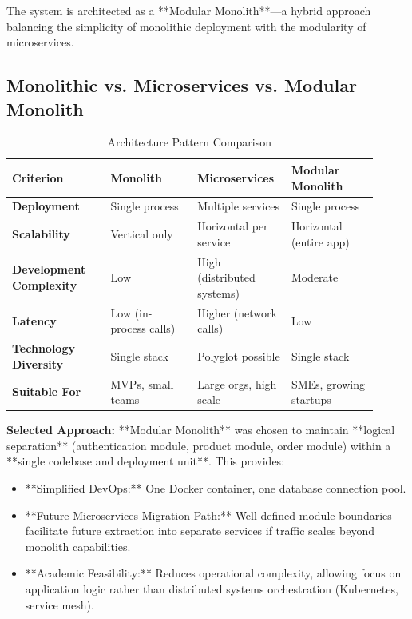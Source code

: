 The system is architected as a **Modular Monolith**—a hybrid approach balancing the simplicity of monolithic deployment with the modularity of microservices.

\subsection{Monolithic vs. Microservices vs. Modular Monolith}

\begin{table}[H]
\centering
\caption{Architecture Pattern Comparison}
\label{tab:architecture_patterns}
\begin{tabular}{@{}p{0.25\linewidth}p{0.22\linewidth}p{0.22\linewidth}p{0.22\linewidth}@{}}
\toprule
\textbf{Criterion} & \textbf{Monolith} & \textbf{Microservices} & \textbf{Modular Monolith} \\
\midrule
\textbf{Deployment} & Single process & Multiple services & Single process \\
\textbf{Scalability} & Vertical only & Horizontal per service & Horizontal (entire app) \\
\textbf{Development Complexity} & Low & High (distributed systems) & Moderate \\
\textbf{Latency} & Low (in-process calls) & Higher (network calls) & Low \\
\textbf{Technology Diversity} & Single stack & Polyglot possible & Single stack \\
\textbf{Suitable For} & MVPs, small teams & Large orgs, high scale & SMEs, growing startups \\
\bottomrule
\end{tabular}
\end{table}

\textbf{Selected Approach:} **Modular Monolith** was chosen to maintain **logical separation** (authentication module, product module, order module) within a **single codebase and deployment unit**. This provides:

\begin{itemize}
    \item **Simplified DevOps:** One Docker container, one database connection pool.
    \item **Future Microservices Migration Path:** Well-defined module boundaries facilitate future extraction into separate services if traffic scales beyond monolith capabilities.
    \item **Academic Feasibility:** Reduces operational complexity, allowing focus on application logic rather than distributed systems orchestration (Kubernetes, service mesh).
\end{itemize}

